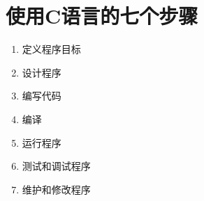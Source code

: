 \section{使用C语言的七个步骤}

 

\begin{frame}\ft{\secname}
  
\begin{enumerate}
\item  定义程序目标\\[0.1in]
 
\item  设计程序\\[0.1in]
 
\item  编写代码\\[0.1in]
% 
\item  编译 \\[0.1in]
\item 运行程序 \\[0.1in]
% 
\item  测试和调试程序\\[0.1in]

\item   维护和修改程序\\[0.1in]
\end{enumerate} 
 
\end{frame}



